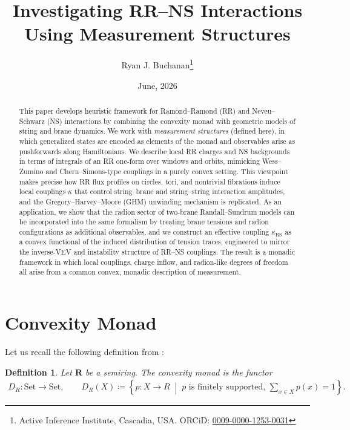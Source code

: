 \documentclass{article}
\title{Investigating RR--NS Interactions Using Measurement Structures}
\author{Ryan J. Buchanan\footnote{Active Inference Institute, Cascadia, USA. ORCiD: \href{https://orcid.org/0009-0000-1253-0031}{0009-0000-1253-0031} }}
\date{June, 2026}
\newtheorem{dn}{Definition}
\numberwithin{tm}{section}
\numberwithin{dn}{section}
\numberwithin{as}{section}
\numberwithin{rk}{section}
\numberwithin{lem}{section}
\numberwithin{ax}{section}
\numberwithin{pp}{section}
\numberwithin{eg}{section}
\numberwithin{war}{section}
\numberwithin{equation}{section}
\numberwithin{prop}{section}
\numberwithin{nt}{section}
\numberwithin{rc}{section}
\numberwithin{setup}{section}
\begin{document}
	\maketitle

\begin{abstract}
	This paper develops heuristic framework for Ramond--Ramond (RR) and Neveu--Schwarz (NS) interactions by combining the convexity monad with geometric models of string and brane dynamics. We work with \emph{measurement structures} (defined here), in which generalized states are encoded as elements of the monad and observables arise as pushforwards along Hamiltonians. We describe local RR charges and NS backgrounds in terms of integrals of an RR one-form over windows and orbits, mimicking Wess--Zumino and Chern--Simons-type couplings in a purely convex setting. This viewpoint makes precise how RR flux profiles on circles, tori, and nontrivial fibrations induce local couplings $\kappa$ that control string--brane and string--string interaction amplitudes, and the Gregory--Harvey--Moore (GHM) unwinding mechanism is replicated. As an application, we show that the radion sector of two-brane Randall--Sundrum models can be incorporated into the same formalism by treating brane tensions and radion configurations as additional observables, and we construct an effective coupling $\kappa_{\mathrm{RS}}$ as a convex functional of the induced distribution of tension traces, engineered to mirror the inverse-VEV and instability structure of RR--NS couplings. The result is a monadic framework in which local couplings, charge inflow, and radion-like degrees of freedom all arise from a common convex, monadic description of measurement.
\end{abstract}

\pagebreak

\tableofcontents
	
	\section{Convexity Monad} \label{Convexity}
	
	Let us recall the following definition from \cite{Haderi}:
	
	\begin{dn} 
		Let $\mathbf{R}$ be a semiring. The \emph{convexity monad} is the functor
		\begin{align} \label{mono1}
			D_R: \mathrm{Set} \longrightarrow \mathrm{Set},
			\qquad
			D_R(X) \coloneq \left\{ p: X \to R \;\middle|\; p \text{ is finitely supported, } \sum_{x \in X} p(x) = 1 \right\}.
		\end{align}
	\end{dn}
	
\end{document}
